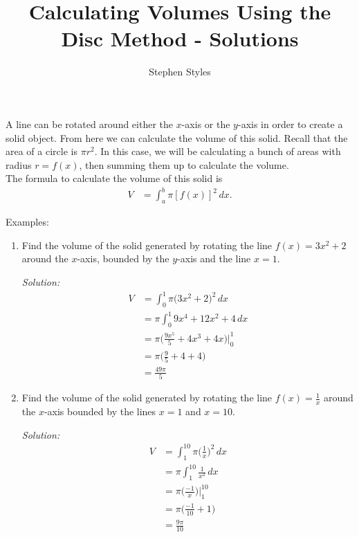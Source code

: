 \documentclass[16pt]{article}
\title{Calculating Volumes Using the Disc Method - Solutions}
\author{Stephen Styles}
\theoremstyle{remark}
\begin{document}
\maketitle

A line can be rotated around either the $x$-axis or the $y$-axis in order to create a solid object. From here we can calculate the volume of this solid. Recall that the area of a circle is $\pi r^2$. In this case, we will be calculating a bunch of areas with radius $r = f(x)$, then summing them up to calculate the volume. \\

The formula to calculate the volume of this solid is 
\begin{align*}
V &= \int_a^b \pi {[ f(x) ]}^2 \, dx.
\end{align*}

Examples:
\begin{enumerate}
\item Find the volume of the solid generated by rotating the line $f(x) = 3x^2 + 2$ around the $x$-axis, bounded by the $y$-axis and the line $x=1$.
\begin{mdframed}[style=TheoremFrame]
\textit{Solution:}
\begin{align*}
V&= \int_0^1 \pi \big(3x^2+2 \big)^2 \, dx\\
&= \pi \int_0^1 9x^4 + 12x^2 + 4 \, dx\\
&= \pi \big( \frac{9x^5}{5} + 4x^3 + 4x \big) \bigg|_0^1\\
&= \pi \big(\frac{9}{5} + 4 + 4 \big)\\
&= \frac{49\pi}{5}
\end{align*}
\end{mdframed}
\item Find the volume of the solid generated by rotating the line $f(x) = \frac{1}{x}$ around the $x$-axis bounded by the lines $x=1$ and $x=10$.
\begin{mdframed}[style=TheoremFrame]
\textit{Solution:}
\begin{align*}
V &= \int_1^{10} \pi \bigg(\frac{1}{x}\bigg)^2 \, dx\\
&= \pi \int_1^{10} \frac{1}{x^2} \, dx\\
&= \pi \bigg(\frac{-1}{x}\bigg) \bigg|_1^{10}\\
&= \pi \bigg( \frac{-1}{10}+1\bigg)\\
&= \frac{9\pi}{10}
\end{align*}
\end{mdframed}
\end{enumerate}
\end{document}
